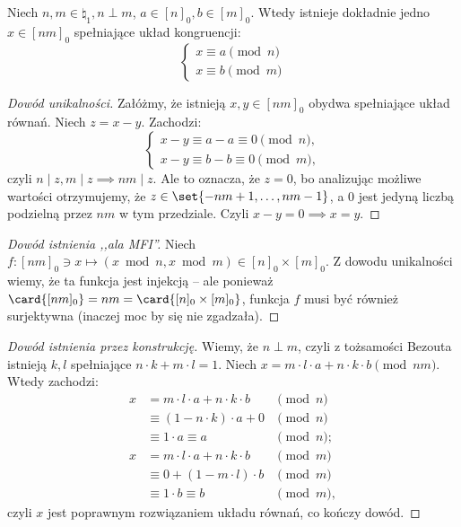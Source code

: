 \begin{theorem}
	Niech $n, m \in \natural_1, n \perp m$, $a \in [n]_0, b \in [m]_0$.
	Wtedy istnieje dokładnie jedno $x \in [nm]_0$ spełniające układ kongruencji:
	\begin{equation*}
		\begin{cases}
			x \equiv a \pmod n \\
			x \equiv b \pmod m
		\end{cases}
	\end{equation*}
\end{theorem}

\begin{proof}[Dowód unikalności]
	Załóżmy, że istnieją $x, y \in [nm]_0$ obydwa spełniające układ równań.
	Niech $z = x-y$. Zachodzi:
	\begin{equation*}
		\begin{cases}
			x - y \equiv a - a \equiv 0 \pmod n, \\
			x - y \equiv b - b \equiv 0 \pmod m,
		\end{cases}
	\end{equation*}
	czyli $n \mid z, m \mid z \implies nm \mid z$. Ale to oznacza, że $z = 0$, bo analizując możliwe wartości
	otrzymujemy, że  $z \in \set{-nm+1, \ldots, nm-1}$, a $0$ jest jedyną liczbą podzielną przez $nm$ w tym przedziale.
	Czyli $x-y = 0 \implies x = y$.
\end{proof}
\begin{proof}[Dowód istnienia ,,ala MFI'']
	Niech $f: [nm]_0 \ni x \mapsto (x \bmod n, x \bmod m) \in [n]_0 \times [m]_0$.
	Z dowodu unikalności wiemy, że ta funkcja jest injekcją -- ale
	ponieważ $\card{[nm]_0} = nm = \card{[n]_0 \times [m]_0}$, funkcja $f$ musi być
	również surjektywna (inaczej moc by się nie zgadzała).
\end{proof}
\begin{proof}[Dowód istnienia przez konstrukcję]
	Wiemy, że $n \perp m$, czyli z tożsamości Bezouta istnieją $k, l$
	spełniające $n \cdot k + m \cdot l = 1$.
	Niech $x = m \cdot l \cdot a + n \cdot k \cdot b\pmod{nm}$. Wtedy zachodzi:
	\begin{align*}
		x & = m \cdot l \cdot a + n \cdot k \cdot b & \pmod n  \\
		  & \equiv (1 - n \cdot k) \cdot a + 0      & \pmod n  \\
		  & \equiv 1 \cdot a \equiv a               & \pmod n; \\
		x & = m \cdot l \cdot a + n \cdot k \cdot b & \pmod m  \\
		  & \equiv 0 + (1 - m \cdot l) \cdot b      & \pmod m  \\
		  & \equiv 1 \cdot b \equiv b               & \pmod m,
	\end{align*}
	czyli $x$ jest poprawnym rozwiązaniem układu równań, co kończy dowód.
\end{proof}

